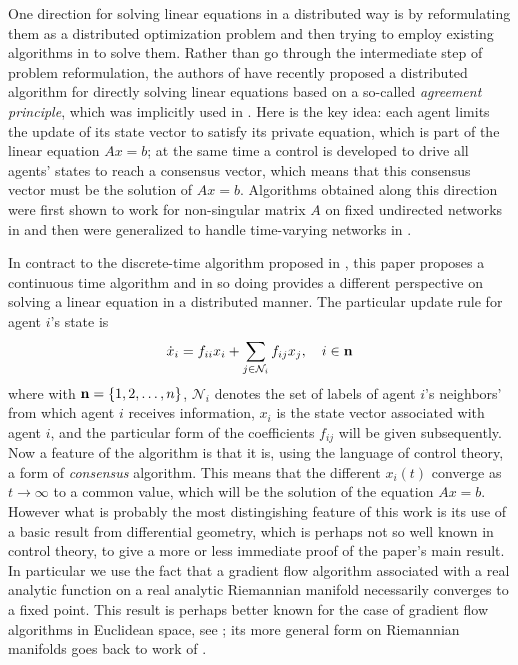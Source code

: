 \documentclass{aims}
\def\n{{\bf n}}
\begin{document}
One direction for solving linear equations in a distributed way is by reformulating them as a distributed optimization problem and then trying to employ existing algorithms in \cite{JAM12TAC,AA14TAC,DJJ14TAC,TAA14TAC} to solve them. Rather than go through the intermediate step of problem reformulation, the authors of \cite{SA13ECC,SJA13Allerton,SJA14TAC} have recently proposed a distributed algorithm for directly solving linear equations based on a so-called \emph{agreement principle}, which was implicitly used in \cite{AAP10TAC}. Here is the key idea: each agent limits the update of its state vector to satisfy its private equation, which is part of the linear equation $Ax=b$; at the same time a control is developed to drive all agents' states to reach a consensus vector, which means that this consensus vector must be the solution of $Ax=b$.  Algorithms obtained along this direction were first shown to work for non-singular matrix $A$ on fixed undirected networks in \cite{SA13ECC} and then were generalized to handle time-varying networks in \cite{SJA14TAC}.

In contract to the discrete-time algorithm proposed in \cite{SJA14TAC}, this paper proposes a continuous time algorithm and in so doing provides a different perspective on solving a linear equation in a distributed manner.
  The particular update rule for agent $i$'s state is
\begin{equation}
\dot x_i=f_{ii}x_i+\sum_{j\in\mathcal N_i}f_{ij}x_j,\quad i\in \n
\end{equation}
where with $\n=\{1,2,\ldots,n\}$, $\mathcal N_i$ denotes the set of labels of agent $i$'s neighbors' from which agent $i$ receives information, $x_i$ is the state vector associated with agent $i$, and the particular form of the coefficients $f_{ij}$ will be given subsequently. Now a feature of the algorithm is that it is, using the language of control theory, a form of {\it{consensus}} algorithm. This means that the different $x_i(t)$ converge as $t\rightarrow \infty$ to a common value, which will be the solution of the equation $Ax=b$. However what is probably the most distingishing feature of this work is its use of a  basic  result  from differential geometry,   which is perhaps not so well known  in control theory, to give a more or less immediate proof  of the paper's main result. In particular we use the fact that a gradient flow algorithm associated with a real analytic function on a real analytic Riemannian
manifold  necessarily converges to a fixed point. This result is
perhaps better known for the case of gradient flow algorithms in Euclidean space, see \cite{Lojasie84};
its more general form on Riemannian manifolds goes back to work of \cite{KTA00Math}.
\end{document}
